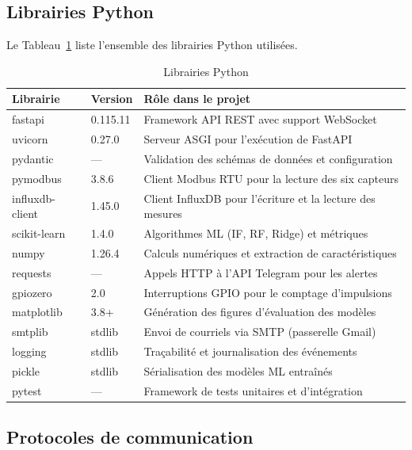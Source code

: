 \subsection{Librairies Python}

Le Tableau~\ref{tab:libs_python} liste l'ensemble des librairies Python utilisées.

\begin{table}[H]
\centering
\renewcommand{\arraystretch}{1.45}
\caption{Librairies Python}
\label{tab:libs_python}
\begin{tabular}{|p{}|p{}|p{}|}
\hline
\rowcolor{gray!25}
\textbf{Librairie} & \textbf{Version} & \textbf{Rôle dans le projet} \\
\hline
fastapi & 0.115.11 & Framework API REST avec support WebSocket \\
\hline
uvicorn & 0.27.0 & Serveur ASGI pour l'exécution de FastAPI \\
\hline
pydantic & --- & Validation des schémas de données et configuration \\
\hline
pymodbus & 3.8.6 & Client Modbus RTU pour la lecture des six capteurs \\
\hline
influxdb-client & 1.45.0 & Client InfluxDB pour l'écriture et la lecture des mesures \\
\hline
scikit-learn & 1.4.0 & Algorithmes ML (IF, RF, Ridge) et métriques \\
\hline
numpy & 1.26.4 & Calculs numériques et extraction de caractéristiques \\
\hline
requests & --- & Appels HTTP à l'API Telegram pour les alertes \\
\hline
gpiozero & 2.0 & Interruptions GPIO pour le comptage d'impulsions \\
\hline
matplotlib & 3.8+ & Génération des figures d'évaluation des modèles \\
\hline
smtplib & stdlib & Envoi de courriels via SMTP (passerelle Gmail) \\
\hline
logging & stdlib & Traçabilité et journalisation des événements \\
\hline
pickle & stdlib & Sérialisation des modèles ML entraînés \\
\hline
pytest & --- & Framework de tests unitaires et d'intégration \\
\hline
\end{tabular}
\end{table}

\subsection{Protocoles de communication}

